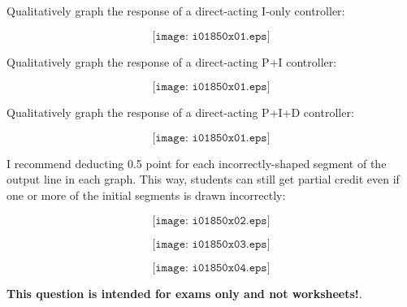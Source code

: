 

Qualitatively graph the response of a direct-acting I-only controller:

$$\texttt{[image: i01850x01.eps]}$$

Qualitatively graph the response of a direct-acting P+I controller:

$$\texttt{[image: i01850x01.eps]}$$

Qualitatively graph the response of a direct-acting P+I+D controller:

$$\texttt{[image: i01850x01.eps]}$$







I recommend deducting 0.5 point for each incorrectly-shaped segment of the output line in each graph.  This way, students can still get partial credit even if one or more of the initial segments is drawn incorrectly:

$$\texttt{[image: i01850x02.eps]}$$

$$\texttt{[image: i01850x03.eps]}$$

$$\texttt{[image: i01850x04.eps]}$$







{\bf This question is intended for exams only and not worksheets!}.



